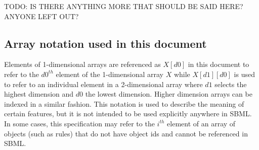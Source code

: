 TODO: IS THERE ANYTHING MORE THAT SHOULD BE SAID HERE?  ANYONE LEFT OUT?

\subsection{Array notation used in this document}

Elements of 1-dimensional arrays are referenced as $X[d0]$ in this document to refer to the  $d0^{th}$ element of the 1-dimensional array $X$ while $X[d1][d0]$ is used to refer to an individual element in a 2-dimensional array where $d1$ selects the highest dimension and $d0$ the lowest dimension.
Higher dimension arrays can be indexed in a similar fashion.
This notation is used to describe the meaning of certain features, but it is not intended to be used explicitly anywhere in SBML. 
In some cases, this specification may refer to the $i^{th}$ element of an array of objects (such as rules) that do not have object ids and cannot be referenced in SBML. 



